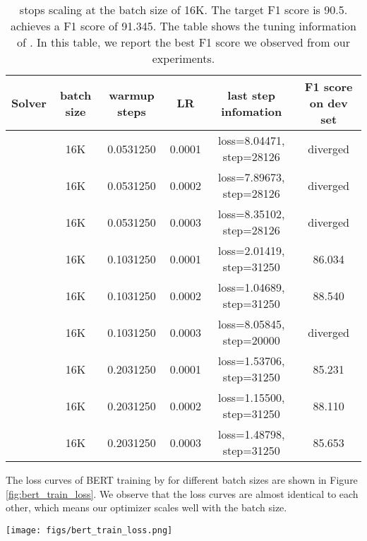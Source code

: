 \documentclass{article} \usepackage{iclr2020_conference,times}
\begin{document}
\begin{table}[ht]
\renewcommand{\arraystretch}{1.3}
\caption{  stops scaling at the batch size of 16K. The target F1 score is 90.5.  achieves a F1 score of 91.345. The table shows the tuning information of . In this table, we report the best F1 score we observed from our experiments.}
\centering
\begin{tabular}{|c|c|c|c|c|c|}
\hline
Solver & batch size & warmup steps & LR & last step infomation & F1 score on dev set\\
\hline
\hline
 & 16K & 0.0531250 & 0.0001 & loss=8.04471, step=28126 & diverged\\
\hline
 & 16K & 0.0531250 & 0.0002 & loss=7.89673, step=28126 & diverged\\
\hline
 & 16K & 0.0531250 & 0.0003 & loss=8.35102, step=28126 & diverged\\
\hline
 & 16K & 0.1031250 & 0.0001 & loss=2.01419, step=31250 & 86.034 \\
\hline
 & 16K & 0.1031250 & 0.0002 & loss=1.04689, step=31250 & 88.540 \\
\hline
 & 16K & 0.1031250 & 0.0003 & loss=8.05845, step=20000 & diverged \\
\hline
 & 16K & 0.2031250 & 0.0001 & loss=1.53706, step=31250 & 85.231 \\
\hline
 & 16K & 0.2031250 & 0.0002 & loss=1.15500, step=31250 & 88.110 \\
\hline
 & 16K & 0.2031250 & 0.0003 & loss=1.48798, step=31250 & 85.653 \\
\hline
\end{tabular}
\label{table:adamw_16k}
\end{table}

The loss curves of BERT training by  for different batch sizes are shown in Figure \ref{fig:bert_train_loss}.
We observe that the loss curves are almost identical to each other, which means our optimizer scales well with the batch size. 

\begin{figure*}[tb]
\vspace{5pt}
\centering
\texttt{[image: figs/bert\_train\_loss.png]}
\caption{This figure shows the training loss curve of  optimizer. We just want to use this figure to show that  can make the training converge smoothly. Even if we scale the batch size to the extremely large cases, the loss curves are almost identical to each other.}
\label{fig:bert_train_loss}
\vspace{-10pt}
\end{figure*}
\end{document}

